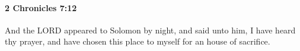 
		\paragraph{2 Chronicles 7:12} %
			\label{2CHRONICLES-7-12}

			And the LORD appeared to Solomon by night, and said unto him, I have heard thy prayer, and have chosen this place to myself for an house of sacrifice.


